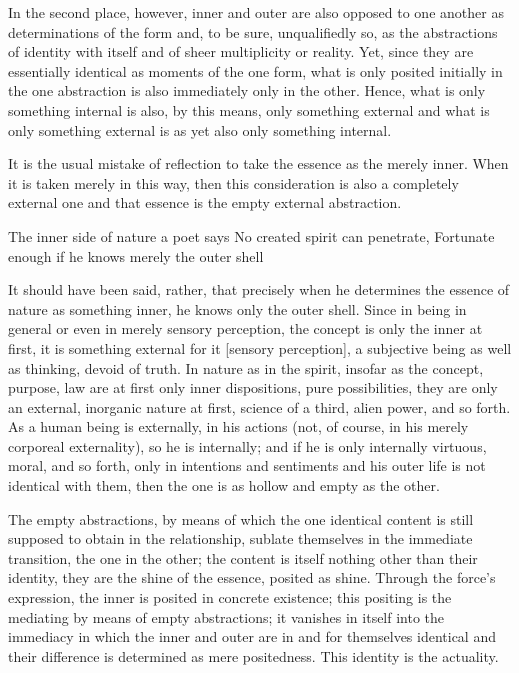 In the second place, however,
inner and outer are also opposed to one another
as determinations of the form
and, to be sure, unqualifiedly so,
as the abstractions of identity with itself
and of sheer multiplicity or reality.
Yet, since they are essentially identical
as moments of the one form,
what is only posited initially
in the one abstraction is
also immediately only in the other.
Hence, what is only something internal is
also, by this means, only something external
and what is only something external is
as yet also only something internal.

    It is the usual mistake of reflection
    to take the essence as the merely inner.
    When it is taken merely in this way,
    then this consideration is
    also a completely external one
    and that essence is the empty external abstraction.

        The inner side of nature a poet says
        No created spirit can penetrate,
        Fortunate enough if he knows merely the outer shell

    It should have been said, rather,
    that precisely when he determines
    the essence of nature as something inner,
    he knows only the outer shell.
    Since in being in general
    or even in merely sensory perception,
    the concept is only the inner at first,
    it is something external for it [sensory perception],
    a subjective being as well as thinking, devoid of truth.
    In nature as in the spirit, insofar as
    the concept, purpose, law are at first
    only inner dispositions, pure possibilities,
    they are only an external, inorganic nature at first,
    science of a third, alien power, and so forth.
    As a human being is externally, in his actions
    (not, of course, in his merely corporeal externality),
    so he is internally;
    and if he is only internally virtuous, moral, and so forth,
    only in intentions and sentiments
    and his outer life is not identical with them,
    then the one is as hollow and empty as the other.

The empty abstractions, by means of which
the one identical content is still supposed
to obtain in the relationship,
sublate themselves in the immediate transition,
the one in the other;
the content is itself nothing other than their identity,
they are the shine of the essence, posited as shine.
Through the force's expression, the inner is posited in concrete existence;
this positing is the mediating by means of empty abstractions;
it vanishes in itself into the immediacy in which
the inner and outer are in and for themselves identical and
their difference is determined as mere positedness.
This identity is the actuality.

